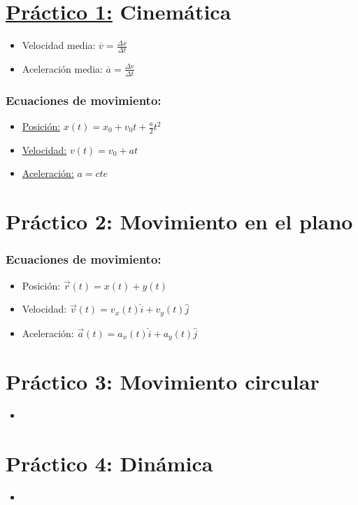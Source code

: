 \documentclass[11pt,a4paper]{article}
\begin{document}
	\section*{\underline{Práctico 1:} Cinemática}
		\begin{multicols}{2}
			\begin{itemize}
				\item Velocidad media: $\overline{v} = \frac{\Delta x}{\Delta t}$
				\item Aceleración media: $\overline{a} = \frac{\Delta v}{\Delta t}$
			\end{itemize}
		\end{multicols}

		\subsubsection*{Ecuaciones de movimiento:}
			\begin{multicols}{3}
				\begin{itemize}
					\item \underline{Posición:} $x(t) = x_{0} + v_{0} t + \frac{a}{2} t^{2}$
					\item \underline{Velocidad:} $v(t) = v_{0} + at$
					\item \underline{Aceleración:} $a = cte$
				\end{itemize}
			\end{multicols}

	\section*{Práctico 2: Movimiento en el plano}
		\subsubsection*{Ecuaciones de movimiento:}
			\begin{itemize}
				\item Posición: $\vec{r}(t) = x(t) + y(t)$
				\item Velocidad: $\vec{v}(t) = v_{x}(t) \hat{i} + v_{y}(t) \hat{j}$
				\item Aceleración: $\vec{a}(t) = a_{x}(t) \hat{i} + a_{y}(t) \hat{j}$
			\end{itemize}

	\section*{Práctico 3: Movimiento circular}
		\begin{itemize}
			\item
		\end{itemize}

	\section*{Práctico 4: Dinámica}
		\begin{itemize}
			\item
		\end{itemize}
\end{document}
